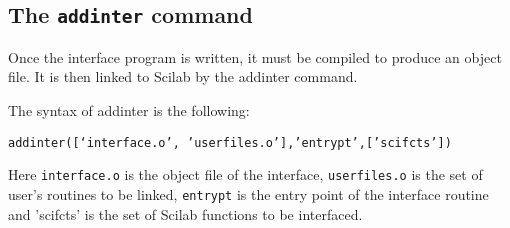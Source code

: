 \subsection{The {\tt addinter} command}
Once the interface program is written, it must be compiled to produce 
an object file. It is then linked to Scilab by the addinter command.

The syntax of addinter is the following:

{\tt addinter([`interface.o', 'userfiles.o'],'entrypt',['scifcts'])}

Here {\tt interface.o} is the object file of the interface, 
{\tt userfiles.o} is the set of user's routines to be linked, 
{\tt entrypt} is the entry point of the interface routine and 
{'scifcts'} is the set of Scilab functions to be interfaced.


